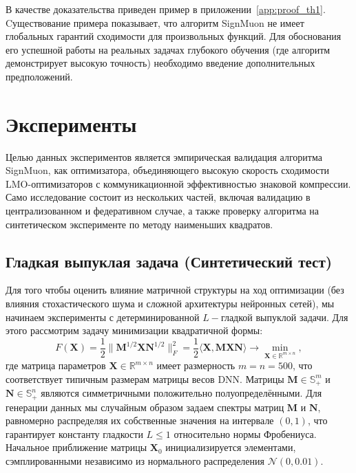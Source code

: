 \documentclass{article}
\begin{document}
В качестве доказательства приведен пример в приложении~\ref{app:proof_th1}. Cуществование примера показывает, что алгоритм SignMuon не имеет глобальных гарантий сходимости для произвольных функций. Для обоснования его успешной работы на реальных задачах глубокого обучения (где алгоритм демонстрирует высокую точность) необходимо введение дополнительных предположений.

\section{Эксперименты}
Целью данных экспериментов является эмпирическая валидация алгоритма SignMuon, как оптимизатора, объединяющего высокую скорость сходимости LMO-оптимизаторов с коммуникационной эффективностью знаковой компрессии. Само исследование состоит из нескольких частей, включая валидацию в централизованном и федеративном случае, а также проверку алгоритма на синтетическом эксперименте по методу наименьших квадратов.

\subsection{Гладкая выпуклая задача (Синтетический тест)}
Для того чтобы оценить влияние матричной структуры на ход оптимизации (без влияния стохастического шума и сложной архитектуры нейронных сетей), мы начинаем эксперименты с детерминированной $L-$гладкой выпуклой задачи. Для этого рассмотрим задачу минимизации квадратичной формы:
\begin{equation}
F(\mathbf{X}) = \frac{1}{2} \|\mathbf{M}^{1/2} \mathbf{X} \mathbf{N}^{1/2}\|_F^2 = \frac{1}{2} \langle \mathbf{X}, \mathbf{M} \mathbf{X} \mathbf{N} \rangle \to \min_{\mathbf{X} \in \mathbb{R}^{m \times n}},
\label{eq:synthetic_problem}
\end{equation}
где матрица параметров $\mathbf{X} \in \mathbb{R}^{m \times n}$ имеет размерность $m = n = 500$, что соответствует типичным размерам матрицы весов DNN. Матрицы $\mathbf{M} \in \mathbb{S}_+^m$ и $\mathbf{N} \in \mathbb{S}_+^n$ являются симметричными положительно полуопределёнными. Для генерации данных мы случайным образом задаем спектры матриц $\mathbf{M}$ и $\mathbf{N}$, равномерно распределяя их собственные значения на интервале $(0, 1)$, что гарантирует константу гладкости $L \le 1$ относительно нормы Фробениуса. Начальное приближение матрицы $\mathbf{X}_0$ инициализируется элементами, сэмплированными независимо из нормального распределения $\mathcal{N}(0, 0.01)$.
\end{document}
